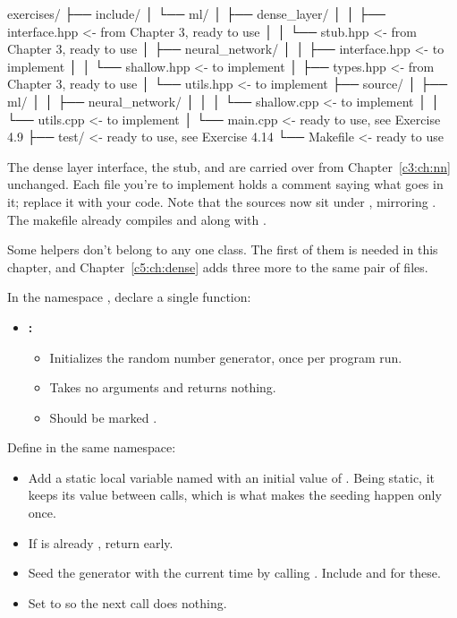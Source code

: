 \begin{console}
exercises/
├── include/
│   └── ml/
│       ├── dense_layer/
│       │   ├── interface.hpp    <- from Chapter 3, ready to use
│       │   └── stub.hpp         <- from Chapter 3, ready to use
│       ├── neural_network/
│       │   ├── interface.hpp    <- to implement
│       │   └── shallow.hpp      <- to implement
│       ├── types.hpp            <- from Chapter 3, ready to use
│       └── utils.hpp            <- to implement
├── source/
│   ├── ml/
│   │   ├── neural_network/
│   │   │   └── shallow.cpp      <- to implement
│   │   └── utils.cpp            <- to implement
│   └── main.cpp                 <- ready to use, see Exercise 4.9
├── test/                        <- ready to use, see Exercise 4.14
└── Makefile                     <- ready to use
\end{console}

\noindent The dense layer interface, the stub, and  are carried over from
Chapter~\ref{c3:ch:nn} unchanged. Each file you're to implement holds a  comment saying
what goes in it; replace it with your code. Note that the sources now sit under ,
mirroring . The makefile already compiles
 and  along with
.

\label{c4:ex:2}
Some helpers don't belong to any one class. The first of them is needed in this chapter, and
Chapter~\ref{c5:ch:dense} adds three more to the same pair of files.

In the namespace , declare a single function:
\begin{itemize}
  \item \textbf{:}
  \begin{itemize}
    \item Initializes the random number generator, once per program run.
    \item Takes no arguments and returns nothing.
    \item Should be marked .
  \end{itemize}
\end{itemize}

Define  in the same namespace:
\begin{itemize}
  \item Add a static local variable named  with an initial value of
    . Being static, it keeps its value between calls, which is what makes the seeding
    happen only once.
  \item If  is already , return early.
  \item Seed the generator with the current time by calling
    . Include  and  for these.
  \item Set  to  so the next call does nothing.
\end{itemize}

